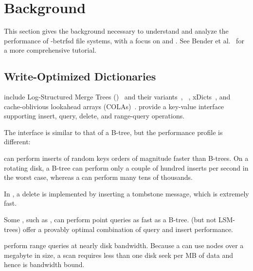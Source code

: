 \section{Background}\label{sec:fsa-background}

This section gives the background necessary to understand and analyze
the performance of \wod-betrfsd file systems, with a focus on \bets and
\betrfs.
See Bender et al.~\cite{bender15login} for  a more comprehensive
tutorial. 

\subsection{Write-Optimized Dictionaries}
\label{ssec:wods}

\wods
include Log-Structured Merge
Trees (\lsms)~\cite{OneilChGa96} and their variants~\cite{SearsRa12, ShettySpMa13, wu15atc},
\bets~\cite{BrodalFa03b}, 
xDicts~\cite{BrodalDeFi10},
and
cache-oblivious lookahead arrays (COLAs)~\cite{BenderFaFi07,santry14atc}.
\wods provide a key-value interface supporting insert, query, delete, and
range-query operations.

The \wod interface is similar to that of a B-tree, but the performance
profile is different:
\begin{compactitem}

\item \wods can perform inserts of random keys orders of magnitude
  faster than B-trees.  On a rotating disk, a B-tree can perform only
  a couple of hundred inserts per second in the worst case, whereas a
  \wod can perform many tens of thousands.

\item In \wods, a delete is implemented by inserting a tombstone message,
  which is extremely fast.

\item Some \wods, such as \bets, can perform point queries 
  as fast as a B-tree. \bets (but not LSM-trees) offer a
  provably optimal combination of query and insert performance.

\item \wods perform range queries at nearly disk bandwidth.
  Because a \wod can use nodes over a megabyte in size,
  a scan requires less than one disk seek per MB of data and
  hence is bandwidth bound.
\end{compactitem}

